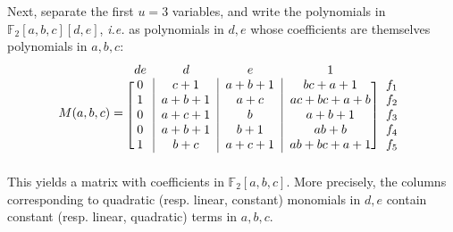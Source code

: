 \documentclass[a4paper,UKenglish,cleveref, autoref]{lipics-v2019}
\begin{document}
Next, separate the first $u=3$ variables, and write the polynomials in
$\mathbb{F}_2[a,b,c][d,e]$, \textit{i.e.} as polynomials in $d, e$ whose coefficients are themselves polynomials in $a, b, c$:
\begin{equation}
  \label{eq:example_matrix}
  M(a,b,c) = \begin{blockarray}{ccccc}
  de & d & e & 1 & \\
  \begin{block}{[c|c|c|c]c}
  0 & c+1 & a+b+1 & bc + a + 1 & f_1\\
  1 & a+b+1 & a+c     & ac +bc + a+b & f_2\\
  0 & a+c+1 & b & a+b+1          & f_3 \\
  0 & a+b+1 & b+1 & ab+b  & f_4 \\
  1 & b+c & a+c+1 & ab+bc+a+1 & f_5 \\
\end{block}
\end{blockarray}
\end{equation}
This yields a matrix with coefficients in $\mathbb{F}_2[a,b,c]$. More precisely,
the columns corresponding to quadratic (resp. linear, constant) monomials in
$d,e$ contain constant (resp. linear, quadratic) terms in $a,b,c$. %
\end{document}
